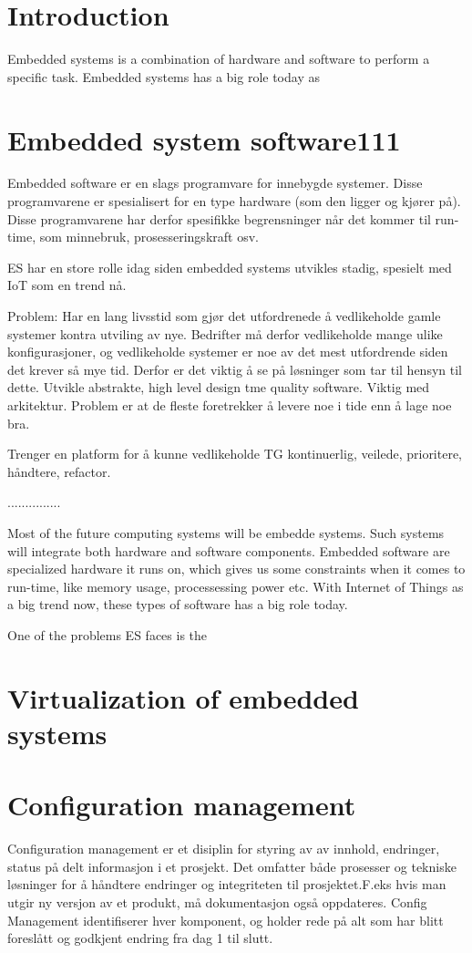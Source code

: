 \section{Introduction}
Embedded systems is a combination of hardware and software to perform a specific task. Embedded systems has a big role today as  


\section{Embedded system software111}


Embedded software er en slags programvare for innebygde systemer. Disse programvarene er spesialisert for en type hardware (som den ligger og kjører på). Disse programvarene har derfor spesifikke begrensninger når det kommer til run-time, som minnebruk, prosesseringskraft osv.

ES har en store rolle idag siden embedded systems utvikles stadig, spesielt med IoT som en trend nå.

Problem: Har en lang livsstid som gjør det utfordrenede å vedlikeholde gamle systemer kontra utviling av nye. Bedrifter må derfor vedlikeholde mange ulike konfigurasjoner, og vedlikeholde systemer er noe av det mest utfordrende siden det krever så mye tid. Derfor er det viktig å se på løsninger som tar til hensyn til dette. Utvikle abstrakte, high level design tme quality software. Viktig med arkitektur. Problem er at de fleste foretrekker å levere noe i tide enn å lage noe bra.

Trenger en platform for å kunne vedlikeholde TG kontinuerlig, veilede, prioritere, håndtere, refactor.


...............

Most of the future computing systems will be embedde systems. Such systems will integrate both hardware and software components\cite{wolfmadsen-2000}. Embedded software are specialized hardware it runs on, which gives us some constraints when it comes to run-time, like memory usage, processessing power etc. With Internet of Things as a big trend now, these types of software has a big role today. 

One of the problems ES faces is the 

\section{Virtualization of embedded systems}


\section{Configuration management}
Configuration management er et disiplin for styring av av innhold, endringer, status på delt informasjon i et prosjekt. Det omfatter både prosesser og tekniske løsninger for å håndtere endringer og integriteten til prosjektet.F.eks hvis man utgir ny versjon av et produkt, må dokumentasjon også oppdateres. Config Management identifiserer hver komponent, og holder rede på alt som har blitt foreslått og godkjent endring fra dag 1 til slutt.

